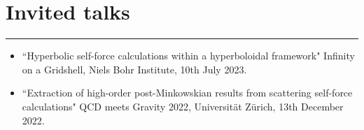 \documentclass[10.5pt, oneside]{article}   	%
\begin{document}
 
  {\color{Sectioncolour}
\section*{Invited talks}
\vspace{-3mm}
\noindent\rule{\linewidth}{0.6pt}}
\begin{itemize}
\item``Hyperbolic self-force calculations within a hyperboloidal framework" Infinity on a Gridshell, Niels Bohr Institute, 10th July 2023.
\item``Extraction of high-order post-Minkowskian results from scattering self-force calculations" QCD meets Gravity 2022, Universität Zürich, 13th December 2022.
\end{itemize} 
 
\end{document}
